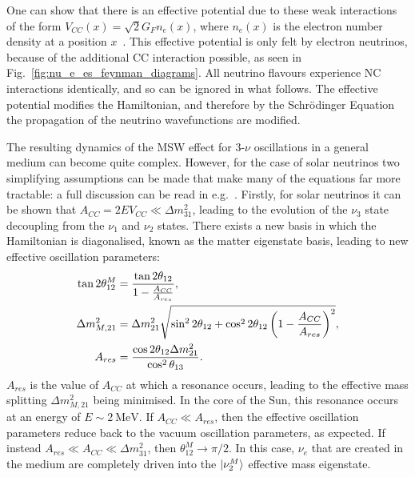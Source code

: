 One can show that there is an effective potential due to these weak interactions of the form $V_{CC}(x) = \sqrt{2}G_{F}n_{e}(x)$, where $n_{e}(x)$ is the electron number density at a position $x$~\cite{giuntiChapterNeutrinoOscillations2007}. %
This effective potential is only felt by electron neutrinos, because of the additional CC interaction possible, as seen in Fig.~\ref{fig:nu_e_es_feynman_diagrams}. All neutrino flavours experience NC interactions identically, and so can be ignored in what follows. The effective potential modifies the Hamiltonian, and therefore by the Schr\"{o}dinger Equation the propagation of the neutrino wavefunctions are modified.

The resulting dynamics of the MSW effect for 3-$\nu$ oscillations in a general medium can become quite complex. However, for the case of solar neutrinos two simplifying assumptions can be made that make many of the equations far more tractable: a full discussion can be read in e.g.~\cite{giuntiChapter13Phenomenology2007}. %
Firstly, for solar neutrinos it can be shown that $A_{CC} = 2EV_{CC} \ll \Delta m^{2}_{31}$, leading to the evolution of the $\nu_{3}$ state decoupling from the $\nu_{1}$ and $\nu_{2}$ states. There exists a new basis in which the Hamiltonian is diagonalised, known as the matter eigenstate basis, leading to new effective oscillation parameters: %
\begin{align}\label{eq:matter_osc_params}
    \tan{2\theta_{12}^{M}} &= \frac{\tan{2\theta_{12}}}{1-\frac{A_{CC}}{A_{res}}},\nonumber\\
    \Delta m^{2}_{M,21} &= \Delta m^{2}_{21}{}\sqrt{\sin^{2}2\theta_{12} + \cos^{2}2\theta_{12}\left(1-\frac{A_{CC}}{A_{res}}\right)^{2}},\\
    A_{res} &= \frac{\cos{2\theta_{12}\ensuremath{\Delta m^{2}_{21}}{}}}{\cos^{2}\theta_{13}}.\nonumber
\end{align}
$A_{res}$ is the value of $A_{CC}$ at which a resonance occurs, leading to the effective mass splitting $\Delta m^{2}_{M,21}$ being minimised. In the core of the Sun, this resonance occurs at an energy of $E\sim \SI{2}{\MeV}$. If $A_{CC} \ll A_{res}$, then the effective oscillation parameters reduce back to the vacuum oscillation parameters, as expected. If instead $A_{res} \ll A_{CC} \ll \Delta m^{2}_{31}$, then $\theta_{12}^{M}\to \pi/2$. In this case, $\nu_{e}$ that are created in the medium are completely driven into the $\ket{\nu_{2}^{M}}$ effective mass eigenstate.

